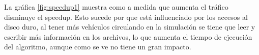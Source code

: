 La gráfica \ref{fig:speedup1} muestra como a medida que aumenta el tráfico disminuye el speedup. Esto sucede por que está influenciado por los accesos al disco duro, al tener más vehículos circulando en la simulación se tiene que leer y escribir más información en los archivos, lo que aumenta el tiempo de ejecución del algoritmo, aunque como se ve no tiene un gran impacto.